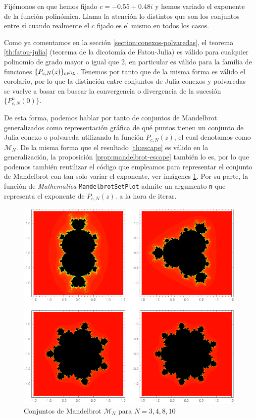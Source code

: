 Fijémonos en que hemos fijado $c=-0.55+0.48i$ y hemos variado el exponente de la función polinómica. Llama la atención lo distintos que son los conjuntos entre sí cuando realmente el $c$ fijado es el mismo en todos los casos. 

Como ya comentamos en la sección \ref{section:conexos-polvaredas}, el teorema \ref{th:fatou-julia} (teorema de la dicotomía de Fatou-Julia) es válido para cualquier polinomio de grado mayor o igual que 2, en particular es válido para la familia de funciones $\{P_{c,N}(z)\}_{c\in\C}$. Tenemos por tanto que de la misma forma es válido el corolario, por lo que la distinción entre conjuntos de Julia conexos y polvaredas se vuelve a basar en buscar la convergencia o divergencia de la sucesión $\{P_{c,N}^n(0)\}$.

De esta forma, podemos hablar por tanto de conjuntos de Mandelbrot generalizados como representación gráfica de qué puntos tienen un conjunto de Julia conexo o polvareda utilizando la función $P_{c,N}(z)$, el cual denotamos como $\mathcal{M}_N$. De la misma forma que el resultado \ref{th:escape} es válido en la generalización, la proposición \ref{prop:mandelbrot-escape} también lo es, por lo que podemos también reutilizar el código que empleamos para representar el conjunto de Mandelbrot con tan solo variar el exponente, ver imágenes \ref{fig:mandelbrot-generalizados}. Por su parte, la función de \textit{Mathematica} \verb|MandelbrotSetPlot| admite un argumento \verb|n| que representa el exponente de $P_{c,N}(z).$ a la hora de iterar.

\begin{figure}[ht]
  \centering
  \includegraphics[scale=0.7]{./img/C3/mandelbrot-generalizado.png}
  \caption{Conjuntos de Mandelbrot $\mathcal{M}_N$ para $N=3,4,8,10$}
  \label{fig:mandelbrot-generalizados}
\end{figure}

